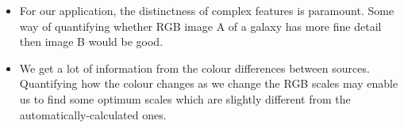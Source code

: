 \documentclass[letterpaper, 11pt]{article}
\def\ra{\ensuremath{\rightarrow}\xspace}
\begin{document}
\begin{itemize}
	\item For our application, the distinctness of complex features is paramount. Some way of quantifying whether RGB image A of a galaxy has more fine detail then image B would be good.
	
	\item We get a lot of information from the colour differences between sources. Quantifying how the colour changes as we change the RGB scales may enable us to find some optimum scales which are slightly different from the automatically-calculated ones.
\end{itemize}

\end{document}
